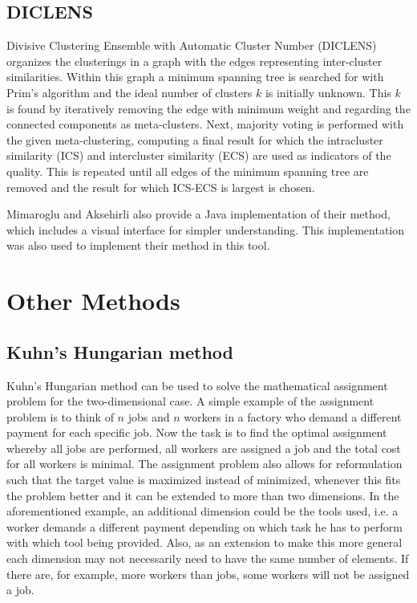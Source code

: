 \documentclass[
	a4paper,
	english,
	twoside,
	openright,               
	11pt                            
	]{report}
\begin{document}
\subsection{DICLENS}
Divisive Clustering Ensemble with Automatic Cluster Number (DICLENS) \cite{DICLENS} organizes the clusterings in a graph with the edges representing inter-cluster similarities. Within this graph a minimum spanning tree is searched for with Prim's algorithm \cite{prim} and the ideal number of clusters $k$ is initially unknown. This $k$ is found by iteratively removing the edge with minimum weight and regarding the connected components as meta-clusters. Next, majority voting is performed with the given meta-clustering, computing a final result for which the intracluster similarity (ICS) and intercluster similarity (ECS) are used as indicators of the quality. This is repeated until all edges of the minimum spanning tree are removed and the result for which ICS-ECS is largest is chosen.

Mimaroglu and Aksehirli \cite{DICLENS} also provide a Java implementation of their method, which includes a visual interface for simpler understanding. This implementation was also used to implement their method in this tool.

\section{Other Methods}

\subsection{Kuhn’s Hungarian method}\label{sec_kuhn}
Kuhn’s Hungarian method \cite{Kuhn2010} can be used to solve the mathematical assignment problem for the two-dimensional case. A simple example of the assignment problem is to think of $n$ jobs and $n$ workers in a factory who demand a different payment for each specific job. Now the task is to find the optimal assignment whereby all jobs are performed, all workers are assigned a job and the total cost for all workers is minimal. The assignment problem also allows for reformulation such that the target value is maximized instead of minimized, whenever this fits the problem better and it can be extended to more than two dimensions. In the aforementioned example, an additional dimension could be the tools used, i.e. a worker demands a different payment depending on which task he has to perform with which tool being provided. Also, as an extension to make this more general each dimension may not necessarily need to have the same number of elements. If there are, for example, more workers than jobs, some workers will not be assigned a job.
\end{document}
